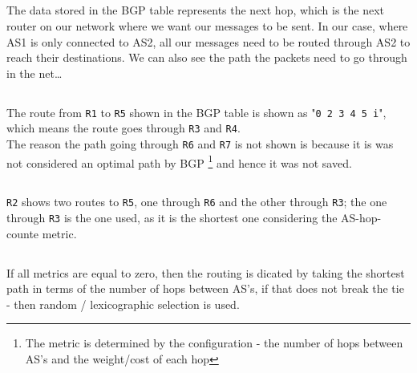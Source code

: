\subsection{}
The data stored in the BGP table represents the next hop, which is the next
router on our network where we want our messages to be sent.
In our case, where AS1 is only connected to AS2, all our messages need to be
routed through AS2 to reach their destinations.
We can also see the path the packets need to go through in the net\dots

\subsection{}
The route from \texttt{R1} to \texttt{R5} shown
in the BGP table is shown as "\texttt{0 2 3 4 5 i}",
which means the route goes through \texttt{R3} and \texttt{R4}.\\
The reason the path going through \texttt{R6} and \texttt{R7} is not
shown is because it is was not considered an optimal path by BGP
\footnote{The metric is determined by the
configuration - the number of hops between AS's and the weight/cost of each hop}
and hence it was not saved.\\

\subsection{}
\texttt{R2} shows two routes to \texttt{R5},
one through \texttt{R6} and the other through \texttt{R3};
the one through \texttt{R3} is the one used, as it is the shortest one
considering the AS-hop-counte metric.

\subsection{}
If all metrics are equal to zero, then the routing is dicated by taking the
shortest path in terms of the number of hops between AS's, if  that does not break
the tie - then random / lexicographic selection is used.

